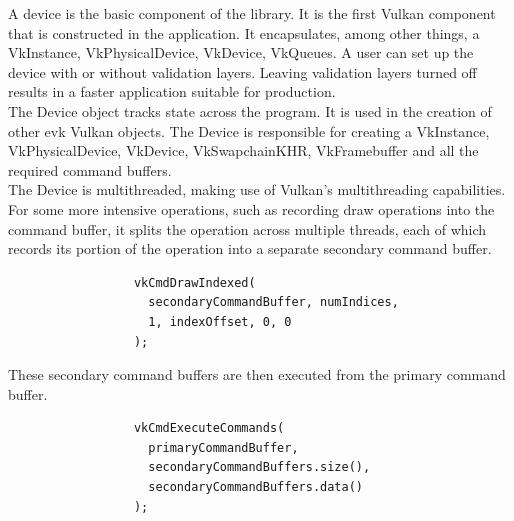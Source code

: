 \documentclass[12pt]{report}
\theoremstyle{definition}
\begin{document}
        A device is the basic component of the library. It is the first Vulkan
        component that is constructed in the application. It encapsulates,
        among other things, a VkInstance, VkPhysicalDevice, VkDevice, VkQueues.
        A user can set up the device with or without validation layers. Leaving
        validation layers turned off results in a faster application suitable
        for production. \\

        The Device object tracks state across the program. It is used in the
        creation of other evk Vulkan objects. The Device is responsible for
        creating a VkInstance, VkPhysicalDevice, VkDevice, VkSwapchainKHR, VkFramebuffer
        and all the required command buffers. \\

        The Device is multithreaded, making use of Vulkan's multithreading
        capabilities. For some more intensive operations, such as recording
        draw operations into the command buffer, it splits the operation
        across multiple threads, each of which records its portion of the
        operation into a separate secondary command buffer. \\

        \begin{figure}[h]
        \begin{verbatim}
            vkCmdDrawIndexed(
              secondaryCommandBuffer, numIndices,
              1, indexOffset, 0, 0
            );
        \end{verbatim}
        \end{figure}

        These secondary command buffers are then executed from the primary
        command buffer.

        \begin{figure}[h]
        \begin{verbatim}
            vkCmdExecuteCommands(
              primaryCommandBuffer,
              secondaryCommandBuffers.size(),
              secondaryCommandBuffers.data()
            );
        \end{verbatim}
        \end{figure}
\end{document}
